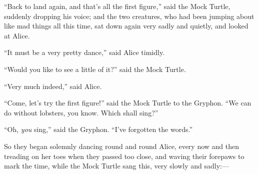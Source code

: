 \documentclass[11pt,openany,oneside]{book}
\begin{document}
“Back to land again, and that’s all the first figure,” said the Mock Turtle, suddenly dropping his voice; and the two creatures, who had been jumping about like mad things all this time, sat down again very sadly and quietly, and looked at Alice. 

“It must be a very pretty dance,” said Alice timidly. 

“Would you like to see a little of it?” said the Mock Turtle. 

“Very much indeed,” said Alice. 

“Come, let’s try the first figure!” said the Mock Turtle to the Gryphon. “We can do without lobsters, you know. Which shall sing?” 

“Oh, {\em you\/} sing,” said the Gryphon. “I’ve forgotten the words.” 

So they began solemnly dancing round and round Alice, every now and then treading on her toes when they passed too close, and waving their forepaws to mark the time, while the Mock Turtle sang this, very slowly and sadly:— 
\end{document}
